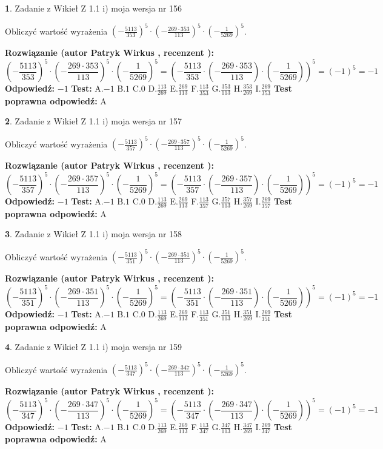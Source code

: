 \documentclass[12pt, a4paper]{article}
\theoremstyle{definition} %
\newtheorem{zad}{}
\newcommand{\zadStart}[1]{\begin{zad}#1\newline}
\newcommand{\zadStop}{\end{zad}}
\newcommand{\rozwStart}[2]{\noindent \textbf{Rozwiązanie (autor #1 , recenzent #2): }\newline}
\newcommand{\rozwStop}{\newline}
\newcommand{\odpStart}{\noindent \textbf{Odpowiedź:}\newline}
\newcommand{\odpStop}{\newline}
\newcommand{\testStart}{\noindent \textbf{Test:}\newline}
\newcommand{\testStop}{\newline}
\newcommand{\kluczStart}{\noindent \textbf{Test poprawna odpowiedź:}\newline}
\newcommand{\kluczStop}{\newline}
\begin{document}
\zadStart{Zadanie z Wikieł Z 1.1 i) moja wersja nr 156}

Obliczyć wartość wyrażenia $(-\frac{5113}{353})^{5} \cdot (-\frac{269 \cdot 353}{113})^{5} \cdot (-\frac{1}{5269})^{5}$.
\zadStop
\rozwStart{Patryk Wirkus}{}
$$(-\frac{5113}{353})^{5} \cdot (-\frac{269 \cdot 353}{113})^{5} \cdot (-\frac{1}{5269})^{5} = (-\frac{5113}{353} \cdot (-\frac{269 \cdot 353}{113}) \cdot (-\frac{1}{5269}))^{5} = (-1)^{5} = -1$$
\rozwStop
\odpStart
$-1$
\odpStop
\testStart
A.$-1$ B.$1$ C.$0$ D.$\frac{113}{269}$ E.$\frac{269}{113}$
F.$\frac{113}{353}$ G.$\frac{353}{113}$
H.$\frac{353}{269}$
I.$\frac{269}{353}$
\testStop
\kluczStart
A
\kluczStop



\zadStart{Zadanie z Wikieł Z 1.1 i) moja wersja nr 157}

Obliczyć wartość wyrażenia $(-\frac{5113}{357})^{5} \cdot (-\frac{269 \cdot 357}{113})^{5} \cdot (-\frac{1}{5269})^{5}$.
\zadStop
\rozwStart{Patryk Wirkus}{}
$$(-\frac{5113}{357})^{5} \cdot (-\frac{269 \cdot 357}{113})^{5} \cdot (-\frac{1}{5269})^{5} = (-\frac{5113}{357} \cdot (-\frac{269 \cdot 357}{113}) \cdot (-\frac{1}{5269}))^{5} = (-1)^{5} = -1$$
\rozwStop
\odpStart
$-1$
\odpStop
\testStart
A.$-1$ B.$1$ C.$0$ D.$\frac{113}{269}$ E.$\frac{269}{113}$
F.$\frac{113}{357}$ G.$\frac{357}{113}$
H.$\frac{357}{269}$
I.$\frac{269}{357}$
\testStop
\kluczStart
A
\kluczStop



\zadStart{Zadanie z Wikieł Z 1.1 i) moja wersja nr 158}

Obliczyć wartość wyrażenia $(-\frac{5113}{351})^{5} \cdot (-\frac{269 \cdot 351}{113})^{5} \cdot (-\frac{1}{5269})^{5}$.
\zadStop
\rozwStart{Patryk Wirkus}{}
$$(-\frac{5113}{351})^{5} \cdot (-\frac{269 \cdot 351}{113})^{5} \cdot (-\frac{1}{5269})^{5} = (-\frac{5113}{351} \cdot (-\frac{269 \cdot 351}{113}) \cdot (-\frac{1}{5269}))^{5} = (-1)^{5} = -1$$
\rozwStop
\odpStart
$-1$
\odpStop
\testStart
A.$-1$ B.$1$ C.$0$ D.$\frac{113}{269}$ E.$\frac{269}{113}$
F.$\frac{113}{351}$ G.$\frac{351}{113}$
H.$\frac{351}{269}$
I.$\frac{269}{351}$
\testStop
\kluczStart
A
\kluczStop



\zadStart{Zadanie z Wikieł Z 1.1 i) moja wersja nr 159}

Obliczyć wartość wyrażenia $(-\frac{5113}{347})^{5} \cdot (-\frac{269 \cdot 347}{113})^{5} \cdot (-\frac{1}{5269})^{5}$.
\zadStop
\rozwStart{Patryk Wirkus}{}
$$(-\frac{5113}{347})^{5} \cdot (-\frac{269 \cdot 347}{113})^{5} \cdot (-\frac{1}{5269})^{5} = (-\frac{5113}{347} \cdot (-\frac{269 \cdot 347}{113}) \cdot (-\frac{1}{5269}))^{5} = (-1)^{5} = -1$$
\rozwStop
\odpStart
$-1$
\odpStop
\testStart
A.$-1$ B.$1$ C.$0$ D.$\frac{113}{269}$ E.$\frac{269}{113}$
F.$\frac{113}{347}$ G.$\frac{347}{113}$
H.$\frac{347}{269}$
I.$\frac{269}{347}$
\testStop
\kluczStart
A
\kluczStop
\end{document}
